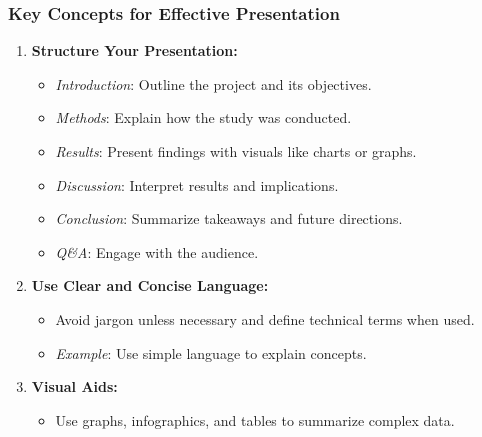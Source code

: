 \documentclass[aspectratio=169]{beamer}
\begin{document}
\begin{frame}[fragile]
    \frametitle{Key Concepts for Effective Presentation}
    \begin{enumerate}
        \item \textbf{Structure Your Presentation:}
            \begin{itemize}
                \item \textit{Introduction}: Outline the project and its objectives.
                \item \textit{Methods}: Explain how the study was conducted.
                \item \textit{Results}: Present findings with visuals like charts or graphs.
                \item \textit{Discussion}: Interpret results and implications.
                \item \textit{Conclusion}: Summarize takeaways and future directions.
                \item \textit{Q\&A}: Engage with the audience.
            \end{itemize}
        \item \textbf{Use Clear and Concise Language:}
            \begin{itemize}
                \item Avoid jargon unless necessary and define technical terms when used.
                \item \textit{Example}: Use simple language to explain concepts.
            \end{itemize}
        \item \textbf{Visual Aids:}
            \begin{itemize}
                \item Use graphs, infographics, and tables to summarize complex data.
            \end{itemize}
    \end{enumerate}
\end{frame}
\end{document}
